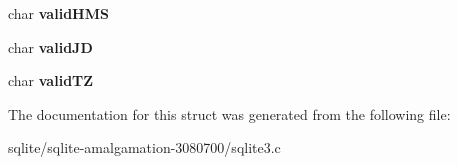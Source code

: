 \begin{DoxyCompactItemize}
\item 
\hypertarget{struct_date_time_aba26b32c6142cf6bfc09db3088b90add}{char {\bfseries valid\+H\+M\+S}}\label{struct_date_time_aba26b32c6142cf6bfc09db3088b90add}

\item 
\hypertarget{struct_date_time_a1962742892150a03dc5d302f43efbb04}{char {\bfseries valid\+J\+D}}\label{struct_date_time_a1962742892150a03dc5d302f43efbb04}

\item 
\hypertarget{struct_date_time_af3dfda2bdbb2183dc1b94f449701b81e}{char {\bfseries valid\+T\+Z}}\label{struct_date_time_af3dfda2bdbb2183dc1b94f449701b81e}

\end{DoxyCompactItemize}


The documentation for this struct was generated from the following file\+:\begin{DoxyCompactItemize}
\item 
sqlite/sqlite-\/amalgamation-\/3080700/sqlite3.\+c\end{DoxyCompactItemize}

